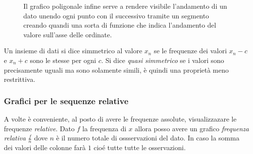 \documentclass{article}
\begin{document}
    \begin{figure}[h]
      \begin{minipage}{0.35\textwidth} %
      \end{minipage}
      \hfill
      \begin{minipage}{0.6\textwidth} %
        Il grafico poligonale infine serve a rendere visibile l'andamento di un dato unendo ogni punto con il successivo tramite un segmento creando quandi una sorta di funzione che indica l'andamento del valore sull'asse delle ordinate.    
      \end{minipage}
    \end{figure}
  
  Un insieme di dati si dice simmetrico al valore $x_n$ se le frequenze dei valori $x_n-c$ e $x_n+c$ sono le stesse per ogni $c$. Si dice \textit{quasi simmetrico} se i valori sono precisamente uguali ma sono solamente simili, è quindi una proprietà meno restrittiva.
  
  \subsubsection*{Grafici per le sequenze relative}
  
  A volte è conveniente, al posto di avere le frequenze assolute, visualizzazare le frequenze \textit{relative}. Dato $f$ la frequenza di $x$ allora posso avere un grafico \textit{frequenza relativa} $\frac{f}{n}$ dove $n$ è il numero totale di ossservazioni del dato. In caso la somma dei valori delle colonne farà $1$ cioé tutte tutte le osservazioni.
  
\end{document}
